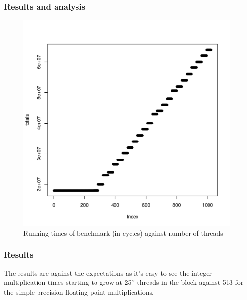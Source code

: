 \documentclass{article}
\def \scalingfactor{.8}
\begin{document}
	\subsubsection{Results and analysis}
    \begin{figure}[h]
    	\centering
		\vspace{-20pt}
	    \includegraphics[width=\scalingfactor\linewidth]{"graphics/running_times"}
		\vspace{-15pt}
        \caption{Running times of benchmark (in cycles) against number of threads}
    \end{figure}
	\pagebreak
    
    \subsubsection{Results}
    The results are against the expectations as it's easy to see the integer
    multiplication times starting to grow at 257 threads in the block against
    513 for the simple-precision floating-point multiplications.
    
\end{document}
